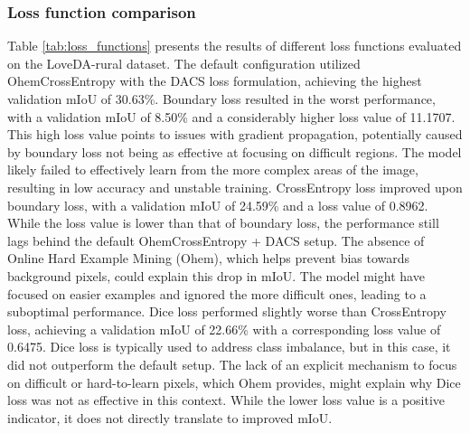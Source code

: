 \documentclass{article}
\begin{document}
\begin{multicols}{2}
        \subsubsection{Loss function comparison}
        \justifying
        Table \ref{tab:loss_functions} presents the results of different loss functions evaluated on the LoveDA-rural dataset. The default configuration utilized OhemCrossEntropy with the DACS loss formulation, achieving the highest validation mIoU of 30.63\%. 
        Boundary loss resulted in the worst performance, with a validation mIoU of 8.50\% and a considerably higher loss value of 11.1707. This high loss value points to issues with gradient propagation, potentially caused by boundary loss not being as effective at focusing on difficult regions. The model likely failed to effectively learn from the more complex areas of the image, resulting in low accuracy and unstable training.
        CrossEntropy loss improved upon boundary loss, with a validation mIoU of 24.59\% and a loss value of 0.8962. While the loss value is lower than that of boundary loss, the performance still lags behind the default OhemCrossEntropy + DACS setup. The absence of Online Hard Example Mining (Ohem), which helps prevent bias towards background pixels, could explain this drop in mIoU. The model might have focused on easier examples and ignored the more difficult ones, leading to a suboptimal performance.
        Dice loss performed slightly worse than CrossEntropy loss, achieving a validation mIoU of 22.66\% with a corresponding loss value of 0.6475. Dice loss is typically used to address class imbalance, but in this case, it did not outperform the default setup. The lack of an explicit mechanism to focus on difficult or hard-to-learn pixels, which Ohem provides, might explain why Dice loss was not as effective in this context. While the lower loss value is a positive indicator, it does not directly translate to improved mIoU.

        
        \begin{table}[H]
			\centering
			\renewcommand{\arraystretch}{1.4} %
			\setlength{\tabcolsep}{6pt} %
			
			\caption{Performance comparison of different loss functions.}
			\label{tab:loss_functions}


\end{table}
\end{multicols}
\end{document}
